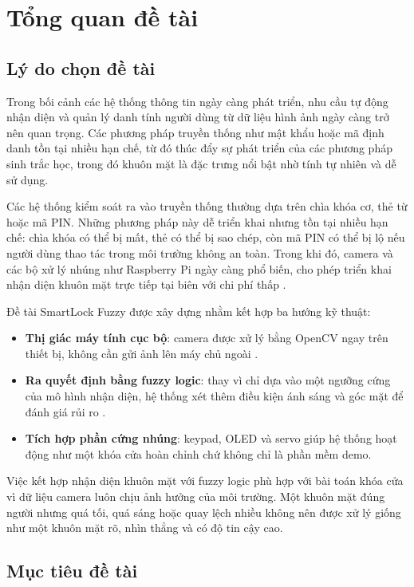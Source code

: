 \section{Tổng quan đề tài}

\subsection{Lý do chọn đề tài}

Trong bối cảnh các hệ thống thông tin ngày càng phát triển, nhu cầu tự động nhận diện và quản lý danh tính người dùng từ dữ liệu hình ảnh ngày càng trở nên quan trọng. Các phương pháp truyền thống như mật khẩu hoặc mã định danh tồn tại nhiều hạn chế, từ đó thúc đẩy sự phát triển của các phương pháp sinh trắc học, trong đó khuôn mặt là đặc trưng nổi bật nhờ tính tự nhiên và dễ sử dụng.


Các hệ thống kiểm soát ra vào truyền thống thường dựa trên chìa khóa cơ, thẻ từ hoặc mã PIN. Những phương pháp này dễ triển khai nhưng tồn tại nhiều hạn chế: chìa khóa có thể bị mất, thẻ có thể bị sao chép, còn mã PIN có thể bị lộ nếu người dùng thao tác trong môi trường không an toàn. Trong khi đó, camera và các bộ xử lý nhúng như Raspberry Pi ngày càng phổ biến, cho phép triển khai nhận diện khuôn mặt trực tiếp tại biên với chi phí thấp \cite{raspberrypi}.

Đề tài SmartLock Fuzzy được xây dựng nhằm kết hợp ba hướng kỹ thuật:

\begin{itemize}
    \item \textbf{Thị giác máy tính cục bộ}: camera được xử lý bằng OpenCV ngay trên thiết bị, không cần gửi ảnh lên máy chủ ngoài \cite{opencv}.
    \item \textbf{Ra quyết định bằng fuzzy logic}: thay vì chỉ dựa vào một ngưỡng cứng của mô hình nhận diện, hệ thống xét thêm điều kiện ánh sáng và góc mặt để đánh giá rủi ro \cite{zadeh1965}.
    \item \textbf{Tích hợp phần cứng nhúng}: keypad, OLED và servo giúp hệ thống hoạt động như một khóa cửa hoàn chỉnh chứ không chỉ là phần mềm demo.
\end{itemize}

Việc kết hợp nhận diện khuôn mặt với fuzzy logic phù hợp với bài toán khóa cửa vì dữ liệu camera luôn chịu ảnh hưởng của môi trường. Một khuôn mặt đúng người nhưng quá tối, quá sáng hoặc quay lệch nhiều không nên được xử lý giống như một khuôn mặt rõ, nhìn thẳng và có độ tin cậy cao.

\subsection{Mục tiêu đề tài}

